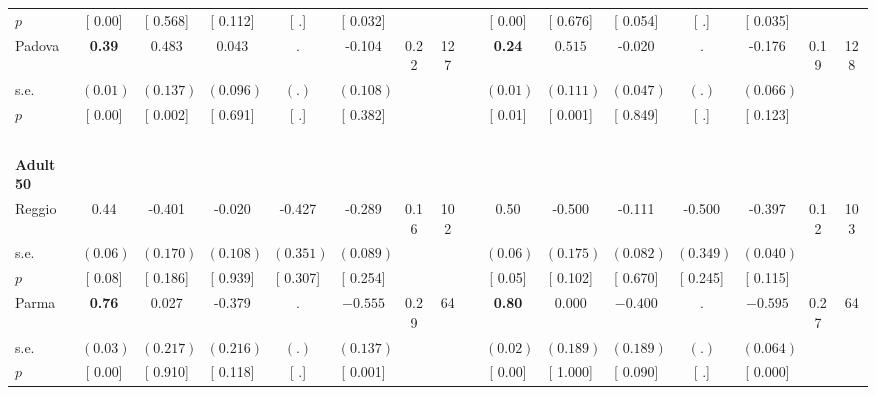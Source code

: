 \begin{longtable}{L{8em} c c c c c c c p{1em} c c c c c c c}
\quad \quad \quad \quad $ p$ & [     0.00] & [    0.568] & [    0.112] & [        .] & [    0.032] & & & & [     0.00] & [    0.676] & [    0.054] & [        .] & [    0.035] & &  \\[1em]
\quad \quad \quad Padova& \textbf{     0.39} & $ \mathbf{    0.483}$ &     0.043 &         . &    -0.104 &      0.22 &       127 & & \textbf{     0.24} & $ \mathbf{    0.515}$ &    -0.020 &         . &    -0.176 &      0.19 &       128  \\*
\quad \quad \quad \quad s.e.& $ (     0.01)$ & $ (    0.137)$ & $ (    0.096)$ & $ (        .)$ & $ (    0.108)$ & & & & $ (     0.01)$ & $ (    0.111)$ & $ (    0.047)$ & $ (        .)$ & $ (    0.066)$ & &  \\*
\quad \quad \quad \quad $ p$ & [     0.00] & [    0.002] & [    0.691] & [        .] & [    0.382] & & & & [     0.01] & [    0.001] & [    0.849] & [        .] & [    0.123] & &  \\[1em]
~\\[1em]
\quad \quad \textbf{Adult 50} & & & & & & & & & & & & & & & \\* 
\quad \quad \quad Reggio& 0.44 &    -0.401 &    -0.020 &    -0.427 &    -0.289 &      0.16 &       102 & & 0.50 &    -0.500 &    -0.111 &    -0.500 &    -0.397 &      0.12 &       103  \\*
\quad \quad \quad \quad s.e.& $ (     0.06)$ & $ (    0.170)$ & $ (    0.108)$ & $ (    0.351)$ & $ (    0.089)$ & & & & $ (     0.06)$ & $ (    0.175)$ & $ (    0.082)$ & $ (    0.349)$ & $ (    0.040)$ & &  \\*
\quad \quad \quad \quad $ p$ & [     0.08] & [    0.186] & [    0.939] & [    0.307] & [    0.254] & & & & [     0.05] & [    0.102] & [    0.670] & [    0.245] & [    0.115] & &  \\[1em]
\quad \quad \quad Parma& \textbf{     0.76} &     0.027 &    -0.379 &         . & $ \mathbf{   -0.555}$ &      0.29 &        64 & & \textbf{     0.80} &     0.000 & $ \mathbf{   -0.400}$ &         . & $ \mathbf{   -0.595}$ &      0.27 &        64  \\*
\quad \quad \quad \quad s.e.& $ (     0.03)$ & $ (    0.217)$ & $ (    0.216)$ & $ (        .)$ & $ (    0.137)$ & & & & $ (     0.02)$ & $ (    0.189)$ & $ (    0.189)$ & $ (        .)$ & $ (    0.064)$ & &  \\*
\quad \quad \quad \quad $ p$ & [     0.00] & [    0.910] & [    0.118] & [        .] & [    0.001] & & & & [     0.00] & [    1.000] & [    0.090] & [        .] & [    0.000] & &  \\[1em]

\end{longtable}
